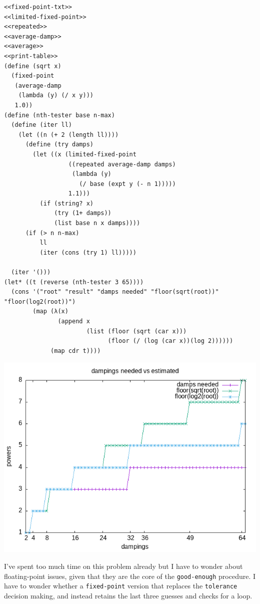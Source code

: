 \documentclass[final,fleqn,titlepage]{article}
\begin{document}
\begin{verbatim}
<<fixed-point-txt>>
<<limited-fixed-point>>
<<repeated>>
<<average-damp>>
<<average>>
<<print-table>>
(define (sqrt x)
  (fixed-point
   (average-damp
    (lambda (y) (/ x y)))
   1.0))
(define (nth-tester base n-max)
  (define (iter ll)
    (let ((n (+ 2 (length ll))))
      (define (try damps)
        (let ((x (limited-fixed-point
                  ((repeated average-damp damps)
                   (lambda (y)
                     (/ base (expt y (- n 1)))))
                  1.1)))
          (if (string? x)
              (try (1+ damps))
              (list base n x damps))))
      (if (> n n-max)
          ll
          (iter (cons (try 1) ll)))))

  (iter '()))
(let* ((t (reverse (nth-tester 3 65))))
  (cons '("root" "result" "damps needed" "floor(sqrt(root))" "floor(log2(root))")
        (map (λ(x)
               (append x
                       (list (floor (sqrt (car x)))
                             (floor (/ (log (car x))(log 2))))))
             (map cdr t))))
\end{verbatim}

\begin{center}
\includegraphics[width=.9\linewidth]{1/fig/1-45-1.png}
\end{center}

I've spent too much time on this problem already but I have to wonder about
floating-point issues, given that they are the core of the \texttt{good-enough}
procedure. I have to wonder whether a \texttt{fixed-point} version that replaces the
\texttt{tolerance} decision making, and instead retains the last three guesses and
checks for a loop.
\end{document}

